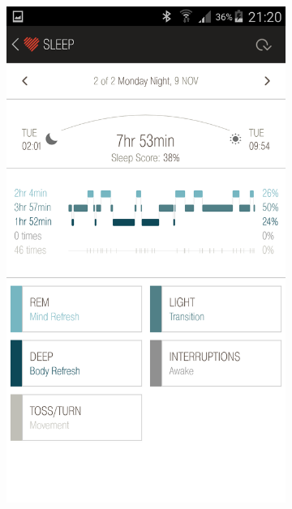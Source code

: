 \documentclass[12pt,a4paper]{article}
\begin{document}
\newpage

\begin{figure}[H]
    \begin{subfigure}[b]{0.5\textwidth}
        \includegraphics[width=\textwidth]{09-11-15-2.png}
     \end{subfigure}
    ~ %
    \begin{subfigure}[b]{0.5\textwidth}

\end{subfigure}
\end{figure}
\end{document}

